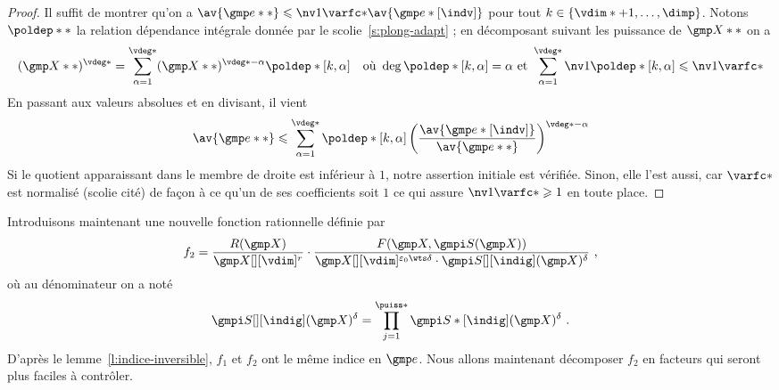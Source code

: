 \begin{proof}
  Il suffit de montrer qu'on a \( \av{ \cex** } \le \nv1{ \varfc* } \av{
      \cex*[\indv] } \) pour tout \( \ind \in \set{\vdim* + 1, \dots, \dimp}
  \). Notons \( \poldep** \) la relation dépendance intégrale donnée par le
  scolie~\ref{s:plong-adapt} ; en décomposant suivant les puissance de \(
    \vmp** \) on a
  \begin{equation}
    (\vmp**) ^{ \vdeg* }
    =
    \sum_{ \alpha=1 }^{ \vdeg* }
    (\vmp**) ^{ \vdeg* - \alpha }
    \poldep*[\ind, \alpha]
    \quad\text{où }
    \deg \poldep*[\ind, \alpha] = \alpha
    \text{ et }
    \sum_{ \alpha=1 }^{ \vdeg* } \nv1{ \poldep*[\ind, \alpha] }
    \le \nv1{ \varfc* }
  \end{equation}
  En passant aux valeurs absolues et en divisant, il vient
  \begin{equation}
    \av{ \cex** }
    \le
    \sum_{ \alpha=1 }^{ \vdeg* }
    \poldep*[\ind, \alpha]
    \left(
      \frac{ \av{\cex*[\indv]} }{ \av{\cex**} }
    \right) ^{ \vdeg* - \alpha }
  \end{equation}
  Si le quotient apparaissant dans le membre de droite est inférieur à \( 1
  \), notre assertion initiale est vérifiée. Sinon, elle l'est aussi, car
  \( \varfc* \) est normalisé (scolie cité) de façon à ce qu'un de ses
  coefficients soit \( 1 \) ce qui assure \( \nv1{ \varfc* } \ge 1 \) en toute
  place.
\end{proof}

Introduisons maintenant une nouvelle fonction rationnelle définie par
\begin{equation}
  f_2 =
  \frac{ R(\vmp) }{ \vmp[][\vdim]^r }
  \cdot
  \frac{
    F( \vmp, \wembcl(\vmp) )
  }{
    \vmp[][\vdim] ^{\epsz \wts \delta}
    \cdot
    \wembcl[][\indig](\vmp) ^{ \delta }
  }
  \pmm,
\end{equation}
où au dénominateur on a noté
\begin{equation}
  \wembcl[][\indig](\vmp) ^{ \delta }
  =
  \prod\fctirange \wembcl*[\indig](\vmp) ^{ \delta }
  \pmm.
\end{equation}
D'après le lemme~\ref{l:indice-inversible}, \( f_1 \) et \( f_2 \) ont le même
indice en \( \cex \). Nous allons maintenant décomposer \( f_2 \) en facteurs
qui seront plus faciles à contrôler.

